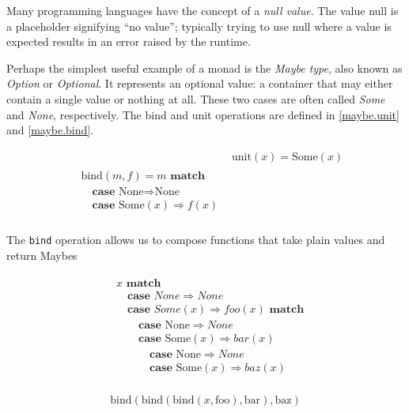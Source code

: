 Many programming languages have the concept of a \emph{null value}. The value null is a placeholder signifying ``no value''; typically trying to use null where a value is expected results in an error raised by the runtime.

Perhaps the simplest useful example of a monad is the \emph{Maybe type}, also known as \emph{Option} or \emph{Optional}. It represents an optional value: a container that may either contain a single value or nothing at all. These two cases are often called \emph{Some} and \emph{None}, respectively. The bind and unit operations are defined in \ref{maybe.unit} and \ref{maybe.bind}.

\begin{align}
& \text{unit}(x) = \text{Some}(x) \label{maybe.unit} \\
\begin{split} \label{maybe.bind}
& \text{bind}(m, f) = m \textbf{ match} \\
& \quad \textbf{case } \text{None} \Rightarrow \text{None} \\
& \quad \textbf{case } \text{Some}(x) \Rightarrow f(x) \\
\end{split}
\end{align}

The \texttt{bind} operation allows us to compose functions that take plain values and return Maybes

\begin{align}
\begin{split}
& x \textbf{ match} \\
& \quad \textbf{case } None \Rightarrow None \\
& \quad \textbf{case } Some(x) \Rightarrow foo(x) \textbf{ match} \\
& \quad\quad \textbf{case } \text{None} \Rightarrow None \\
& \quad\quad \textbf{case } \text{Some}(x) \Rightarrow bar(x) \\
& \quad\quad\quad \textbf{case } \text{None} \Rightarrow None \\
& \quad\quad\quad \textbf{case } \text{Some}(x) \Rightarrow baz(x) \\
\end{split}
\end{align}

\begin{equation}
\text{bind}(\text{bind}(\text{bind}(x, \text{foo}), \text{bar}), \text{baz})
\end{equation}

